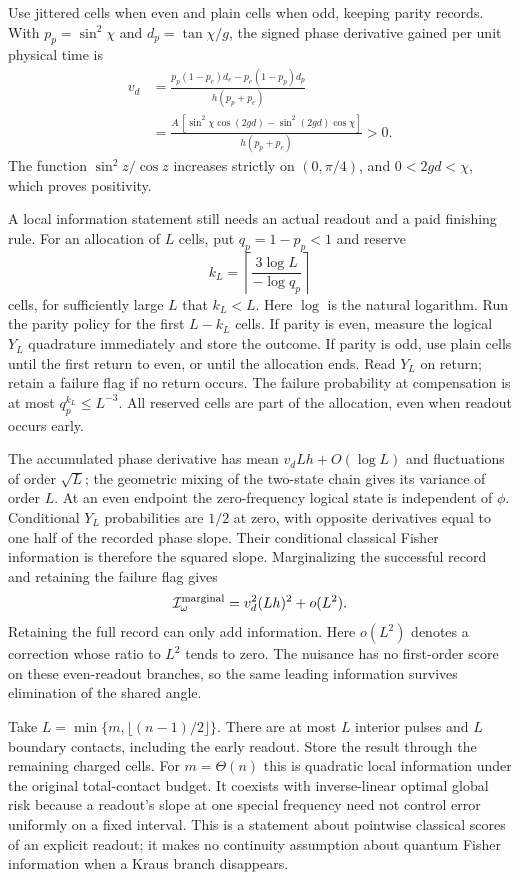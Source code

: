 \documentclass[11pt,a4paper]{article}
\numberwithin{equation}{section}
\theoremstyle{remark}
\begin{document}
Use jittered cells when even and plain cells when odd, keeping parity
records. With $p_p=\sin^2\chi$ and $d_p=\tan\chi/g$, the signed phase
derivative gained per unit physical time is
\begin{align}
 v_d&=\frac{p_p(1-p_e)d_e-p_e(1-p_p)d_p}{h(p_p+p_e)}\nonumber\\
 &=\frac{A\,[\sin^2\chi\cos(2gd)-\sin^2(2gd)\cos\chi]}
 {h(p_p+p_e)}>0.
 \label{tim:local-drift}
\end{align}
The function $\sin^2z/\cos z$ increases strictly on $(0,\pi/4)$, and
$0<2gd<\chi$, which proves positivity.

A local information statement still needs an actual readout and a paid
finishing rule. For an allocation of $L$ cells, put $q_p=1-p_p<1$ and reserve
\begin{equation}
 k_L=\left\lceil\frac{3\log L}{-\log q_p}\right\rceil
\end{equation}
cells, for sufficiently large $L$ that $k_L<L$. Here $\log$ is the natural
logarithm. Run the parity policy for the first $L-k_L$ cells. If parity is
even, measure the logical $Y_L$ quadrature immediately and store the outcome.
If parity is odd, use plain cells until the first return to even, or until
the allocation ends. Read $Y_L$ on return; retain a failure flag if no return
occurs. The failure probability at compensation is at most
$q_p^{k_L}\le L^{-3}$. All reserved cells are part of the allocation, even
when readout occurs early.

The accumulated phase derivative has mean $v_dLh+O(\log L)$ and fluctuations
of order $\sqrt L$; the geometric mixing of the two-state chain gives its
variance of order $L$. At an even endpoint the zero-frequency logical state
is independent of $\phi$. Conditional $Y_L$ probabilities are $1/2$ at zero,
with opposite derivatives equal to one half of the recorded phase slope.
Their conditional classical Fisher information is therefore the squared
slope. Marginalizing the successful record and retaining the failure flag
gives
\begin{equation}
 \mathcal I_\omega^{\rm marginal}=v_d^2(Lh)^2+o(L^2).
\end{equation}
Retaining the full record can only add information.
Here $o(L^2)$ denotes a correction whose ratio to $L^2$ tends to zero.
The nuisance has no first-order score on these even-readout branches, so the
same leading information survives elimination of the shared angle.

Take $L=\min\{m,\lfloor(n-1)/2\rfloor\}$. There are at most $L$ interior
pulses and $L$ boundary contacts, including the early readout. Store the
result through the remaining charged cells. For $m=\Theta(n)$ this is
quadratic local information under the original total-contact budget.
It coexists with inverse-linear optimal global risk because a readout's
slope at one special frequency need not control error uniformly on a fixed
interval. This is a statement about pointwise classical scores of an
explicit readout; it makes no continuity assumption about quantum
Fisher information when a Kraus branch disappears.
\end{document}

